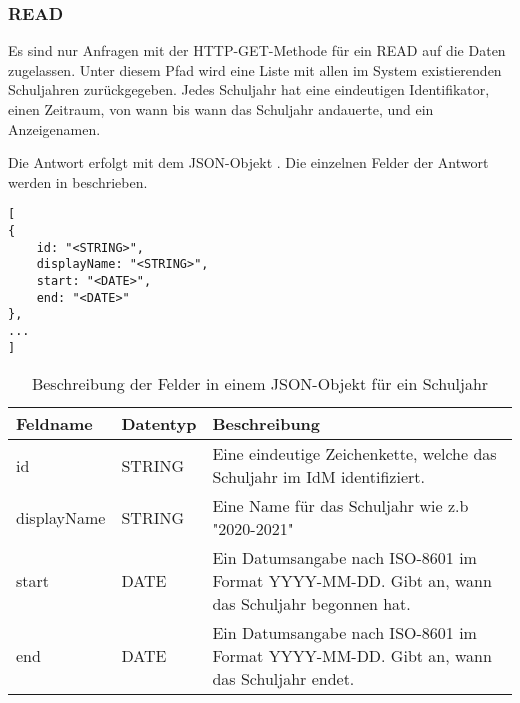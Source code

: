 \subsubsection{READ}
\label{sec:rest:api:school-years:read}
Es sind nur Anfragen mit der HTTP-GET-Methode für ein READ auf die Daten zugelassen.
Unter diesem Pfad wird eine Liste mit allen im System existierenden Schuljahren zurückgegeben.
Jedes Schuljahr hat eine eindeutigen Identifikator, einen Zeitraum, von wann bis wann das Schuljahr andauerte, und ein Anzeigenamen.

Die Antwort erfolgt mit dem JSON-Objekt . 
Die einzelnen Felder der Antwort werden in  beschrieben.

\begin{lstlisting}[caption={JSON-Antwort für einen GET-Aufruf des Pfads /api/school-years},label={lst:code:rest:api:school-years:read:ret},frame=tlrb]
[
{
    id: "<STRING>",
    displayName: "<STRING>",
    start: "<DATE>",
    end: "<DATE>"
},
...
]
\end{lstlisting}

\begin{longtable}{|p{}|p{}|p{}|}
		\caption{Beschreibung der Felder in einem JSON-Objekt für ein Schuljahr}
\endfoot
		\caption{Beschreibung der Felder in einem JSON-Objekt für ein Schuljahr}
		\label{tab:rest:api:school-years:read:ret:json}
\endlastfoot 
\hline
			\textbf{Feldname} & \textbf{Datentyp} & \textbf{Beschreibung} \\ \hline
\endhead
 id & STRING & Eine eindeutige Zeichenkette, welche das Schuljahr im IdM identifiziert. \\ \hline
 displayName & STRING & Eine Name für das Schuljahr wie z.b "2020-2021" \\ \hline
 start & DATE & Ein Datumsangabe nach ISO-8601 im Format YYYY-MM-DD. Gibt an, wann das Schuljahr begonnen hat. \\ \hline
 end & DATE & Ein Datumsangabe nach ISO-8601 im Format YYYY-MM-DD. Gibt an, wann das Schuljahr endet. \\ \hline
\end{longtable}
